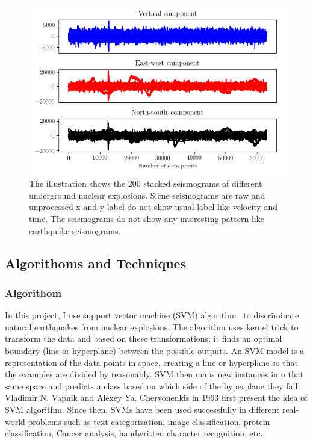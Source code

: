 \documentclass[12pt]{article}
\begin{document}
        \begin{figure}[H]
            \begin{center}
            \includegraphics[scale=0.8]{figures/stacked_explosions.png}
            \end{center}
            \caption{The illustration shows the 200 stacked seismograms of different underground nuclear explosions. Sicne seismograms are raw and unprocessed x and y label do not show usual label like velocity and time. The seismograms do not show any interesting pattern like earthquake seismograms.}
            \label{fig:stacked_explosions.png}
        \end{figure}
        
        \subsection{Algorithoms and Techniques}
    
        \subsubsection{Algorithom}
        In this project, I use support vector machine (SVM) algorithm~\citep{cortes1995support} to discriminate natural earthquakes from nuclear explosions.  The algorithm uses kernel trick to transform the data and based on these transformations; it finds an optimal boundary (line or hyperplane) between the possible outputs. An SVM model is a representation of the data points in space, creating a line or hyperplane so that the examples are divided by reasonably. SVM then maps new instances into that same space and predicts a class based on which side of the hyperplane they fall. Vladimir N. Vapnik and Alexey Ya. Chervonenkis in 1963 first present the idea of SVM algorithm. Since then, SVMs have been used successfully in different real-world problems such as text categorization, image classification, protein classification, Cancer analysis, handwritten character recognition, etc.
        
\end{document}
